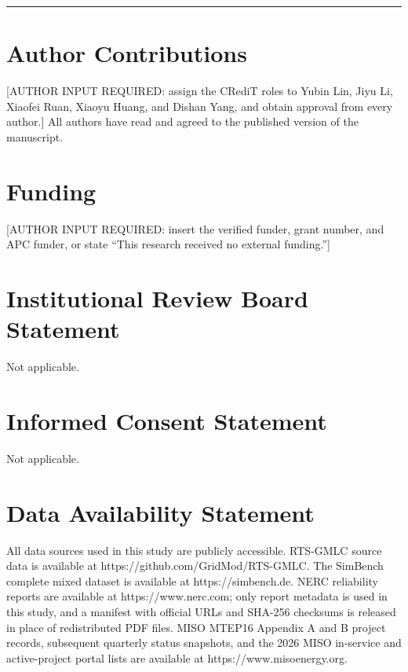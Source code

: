 \documentclass[
  10pt,
  a4paper,
]{article}
\begin{document}
\begin{center}\rule{0.5\linewidth}{0.5pt}\end{center}

\section{Author Contributions}\label{author-contributions}

{[}AUTHOR INPUT REQUIRED: assign the CRediT roles to Yubin Lin, Jiyu Li,
Xiaofei Ruan, Xiaoyu Huang, and Dishan Yang, and obtain approval from
every author.{]} All authors have read and agreed to the published
version of the manuscript.

\section{Funding}\label{funding}

{[}AUTHOR INPUT REQUIRED: insert the verified funder, grant number, and
APC funder, or state ``This research received no external funding.''{]}

\section{Institutional Review Board
Statement}\label{institutional-review-board-statement}

Not applicable.

\section{Informed Consent Statement}\label{informed-consent-statement}

Not applicable.

\section{Data Availability Statement}\label{data-availability-statement}

All data sources used in this study are publicly accessible. RTS-GMLC
source data is available at https://github.com/GridMod/RTS-GMLC. The
SimBench complete mixed dataset is available at https://simbench.de.
NERC reliability reports are available at https://www.nerc.com; only
report metadata is used in this study, and a manifest with official URLs
and SHA-256 checksums is released in place of redistributed PDF files.
MISO MTEP16 Appendix A and B project records, subsequent quarterly
status snapshots, and the 2026 MISO in-service and active-project portal
lists are available at https://www.misoenergy.org.
\end{document}
